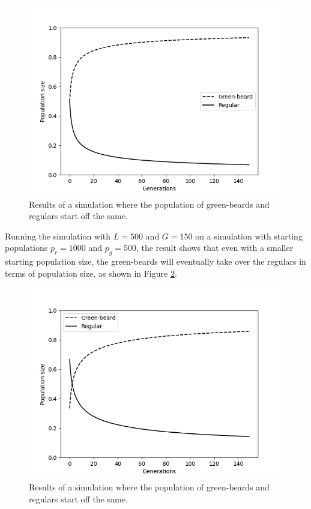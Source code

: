 \documentclass[conference]{IEEEtran}
\begin{document}
	\begin{figure}[htbp]
		\centerline{\includegraphics[scale=0.5]{figures/50-50.png}}
		\caption{Results of a simulation where the population of green-beards and regulars start off the same.}
		\label{fig:50-50}
	\end{figure}
	
	Running the simulation with $L = 500$ and $G = 150$ on a simulation with starting populations $p_r = 1000$ and $p_g = 500$, the result shows that even with a smaller starting population size, the green-beards will eventually take over the regulars in terms of population size, as shown in Figure \ref{fig:1000-500}.

	\begin{figure}[htbp]
		\centerline{\includegraphics[scale=0.5]{figures/1000-500.png}}
		\caption{Results of a simulation where the population of green-beards and regulars start off the same.}
		\label{fig:1000-500}
	\end{figure}
\end{document}
